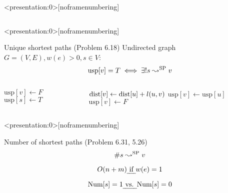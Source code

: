 
\begin{frame}<presentation:0>[noframenumbering]
  \centerline{}
\end{frame}

\begin{frame}
  \begin{columns}
      
  \end{columns}
\end{frame}

\begin{frame}<presentation:0>[noframenumbering]
  \begin{exampleblock}{Unique shortest paths (Problem 6.18)}
    Undirected graph $G = (V, E), w(e) > 0, s \in V$:
    \[
      \text{usp}[v] = T \iff \exists! s \leadsto^{\text{SP}} v 
    \]
  \end{exampleblock}

  \begin{columns}[t]
      \begin{algorithmic}
	  \State $\text{usp}[v] \gets F$
	\EndFor
	\State $\text{usp}[s] \gets T$
      \end{algorithmic}
      \begin{algorithmic}
	  \State $\text{dist}[v] \gets \text{dist}[u] + l(u,v)$
	  \State $\text{usp}[v] \gets \text{usp}[u]$
	  \State $\text{usp}[v] \gets F$
	\EndIf
      \end{algorithmic}
  \end{columns}
\end{frame}

\begin{frame}<presentation:0>[noframenumbering]
  \begin{exampleblock}{Number of shortest paths (Problem 6.31, 5.26)}
    \[
      \# s \leadsto^{\text{SP}} v
    \]

    \[
      O(n + m) \text{\emph{ if }} w(e) = 1
    \]
  \end{exampleblock}

  \[
    \text{Num}[s] = 1 \text{\emph{ vs. }} \text{Num}[s] = 0
  \]
\end{frame}

